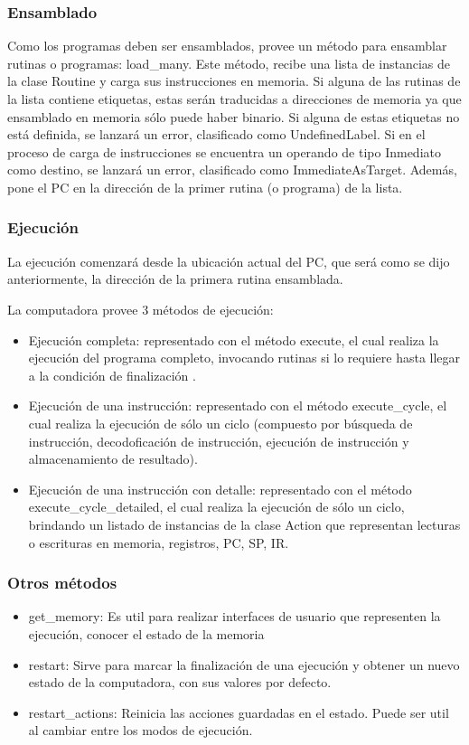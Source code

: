 \subsubsection{Ensamblado}
Como los programas deben ser ensamblados, provee un método para ensamblar rutinas o programas: load\_many. Este método, recibe una lista de instancias de la clase Routine y carga sus instrucciones en memoria. Si alguna de las rutinas de la lista contiene etiquetas, estas serán traducidas a direcciones de memoria ya que ensamblado en memoria sólo puede haber binario. Si alguna de estas etiquetas no está definida, se lanzará un error, clasificado como UndefinedLabel.
Si en el proceso de carga de instrucciones se encuentra un operando de tipo Inmediato como destino, se lanzará un error, clasificado como ImmediateAsTarget.
Además, pone el PC en la dirección de la primer rutina (o programa) de la lista.

\subsubsection{Ejecución}
La ejecución comenzará desde la ubicación actual del PC, que será como se dijo anteriormente, la dirección de la primera rutina ensamblada.

La computadora provee 3 métodos de ejecución:
\begin{itemize}
\item Ejecución completa: representado con el método execute, el cual realiza la ejecución del programa completo, invocando rutinas si lo requiere hasta llegar a la condición de finalización .
\item Ejecución de una instrucción: representado con el método execute\_cycle, el cual realiza la ejecución de sólo un ciclo (compuesto por búsqueda de instrucción, decodoficación de instrucción, ejecución de instrucción y almacenamiento de resultado).
\item Ejecución de una instrucción con detalle: representado con el método execute\_cycle\_detailed, el cual realiza la ejecución de sólo un ciclo, brindando un listado de instancias de la clase Action que representan lecturas o escrituras en memoria, registros, PC, SP, IR.
\end{itemize}

\subsubsection{Otros métodos}
\begin{itemize}
\item get\_memory: Es util para realizar interfaces de usuario que representen la ejecución, conocer el estado de la memoria
\item restart: Sirve para marcar la finalización de una ejecución y obtener un nuevo estado de la computadora, con sus valores por defecto.
\item restart\_actions: Reinicia las acciones guardadas en el estado. Puede ser util al cambiar entre los modos de ejecución.
\end{itemize}


